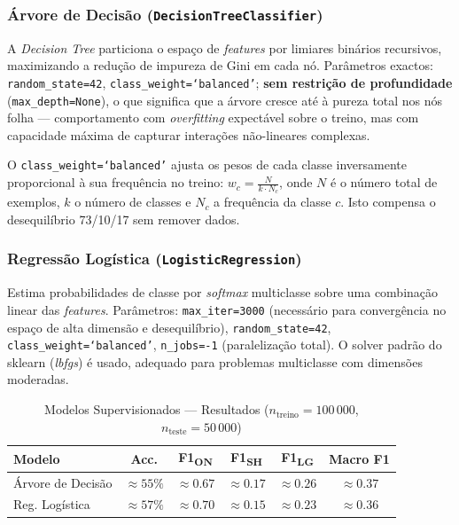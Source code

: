 \documentclass[conference]{IEEEtran}
\begin{document}
\subsubsection{Árvore de Decisão (\texttt{DecisionTreeClassifier})}
A \textit{Decision Tree} particiona o espaço de \textit{features} por limiares
binários recursivos, maximizando a redução de impureza de Gini em cada nó.
Parâmetros exactos: \texttt{random\_state=42}, \texttt{class\_weight=`balanced'};
\textbf{sem restrição de profundidade} (\texttt{max\_depth=None}), o que significa
que a árvore cresce até à pureza total nos nós folha — comportamento com
\textit{overfitting} expectável sobre o treino, mas com capacidade máxima de
capturar interações não-lineares complexas.

O \texttt{class\_weight=`balanced'} ajusta os pesos de cada classe
inversamente proporcional à sua frequência no treino:
$w_c = \frac{N}{k \cdot N_c}$, onde $N$ é o número total de exemplos,
$k$ o número de classes e $N_c$ a frequência da classe $c$. Isto compensa
o desequilíbrio 73/10/17 sem remover dados.

\subsubsection{Regressão Logística (\texttt{LogisticRegression})}
Estima probabilidades de classe por \textit{softmax} multiclasse sobre uma
combinação linear das \textit{features}. Parâmetros: \texttt{max\_iter=3000}
(necessário para convergência no espaço de alta dimensão e desequilíbrio),
\texttt{random\_state=42}, \texttt{class\_weight=`balanced'}, \texttt{n\_jobs=-1}
(paralelização total). O solver padrão do sklearn (\textit{lbfgs}) é usado,
adequado para problemas multiclasse com dimensões moderadas.

\begin{table}[h]
\centering
\caption{Modelos Supervisionados — Resultados ($n_{\text{treino}}=100\,000$, $n_{\text{teste}}=50\,000$)}
\label{tab:supervised}
\setlength{\tabcolsep}{4pt}
\begin{tabular}{lccccc}
\toprule
\textbf{Modelo} & \textbf{Acc.} & \textbf{F1\textsubscript{ON}} & \textbf{F1\textsubscript{SH}} & \textbf{F1\textsubscript{LG}} & \textbf{Macro F1} \\
\midrule
Árvore de Decisão   & $\approx 55\%$ & $\approx 0.67$ & $\approx 0.17$ & $\approx 0.26$ & $\approx 0.37$ \\
Reg. Logística      & $\approx 57\%$ & $\approx 0.70$ & $\approx 0.15$ & $\approx 0.23$ & $\approx 0.36$ \\
\bottomrule
\end{tabular}
\end{table}
\end{document}
